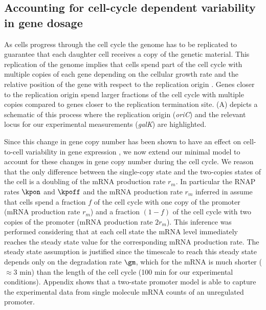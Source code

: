 \subsection*{Accounting for cell-cycle dependent variability in gene dosage}
\label{sec_cell_cycle}

As cells progress through the cell cycle the genome has to be replicated to
guarantee that each daughter cell receives a copy of the genetic material.
This replication of the genome implies that cells spend part of the cell cycle
with multiple copies of each gene depending on the cellular growth rate and the
relative position of the gene with respect to the replication origin
\cite{Bremer1996}. Genes closer to the replication origin spend larger fractions
of the cell cycle with multiple copies compared to genes closer to the
replication termination site. (A) depicts a schematic of
this process where the replication origin ({\it oriC}) and the relevant locus
for our experimental measurements ({\it galK}) are highlighted.

Since this change in gene copy number has been shown to have an effect on
cell-to-cell variability in gene expression \cite{Jones2014a, Peterson2015}, we
now extend our minimal model to account for these changes in gene copy number
during the cell cycle.  We reason that the only difference between the
single-copy state and the two-copies states of the cell is a doubling of the
mRNA production rate $r_m$. In particular the RNAP rates $\kpon$ and $\kpoff$
and the mRNA production rate $r_m$ inferred in 
assume that cells spend a fraction $f$ of the cell cycle  with one copy of the
promoter (mRNA production rate $r_m$) and a fraction $(1-f)$ of the cell cycle
with two copies of the promoter (mRNA production rate $2 r_m$). This inference
was performed considering that at each cell state the mRNA level immediately
reaches the steady state value for the corresponding mRNA production rate. The
steady state assumption is justified since the timescale to reach this steady
state depends only on the degradation rate $\gm$, which for the mRNA  is much
shorter ($\approx 3$ min) than the length of the cell cycle (100 min for our
experimental conditions). Appendix 
shows that  a two-state promoter model is able to capture the experimental data
from single molecule mRNA counts of an unregulated promoter.

